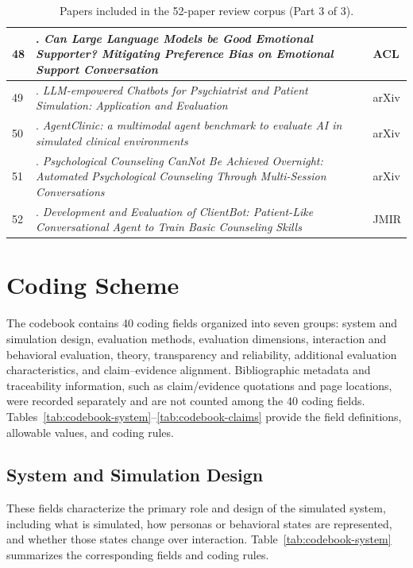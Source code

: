 \begin{table}[p]
\begin{tabular}{p{0.8cm}p{11.1cm}p{3.0cm}}
\midrule
48 &
\citealp{Kang2024Can}. \textit{Can Large Language Models be Good Emotional Supporter? Mitigating Preference Bias on Emotional Support Conversation} &
ACL \\
\midrule
49 &
\citealp{Chen2023LLM-empowered}. \textit{LLM-empowered Chatbots for Psychiatrist and Patient Simulation: Application and Evaluation} &
arXiv \\
\midrule
50 &
\citealp{Schmidgall2025AgentClinic}. \textit{AgentClinic: a multimodal agent benchmark to evaluate AI in simulated clinical environments} &
arXiv \\
\midrule
51 &
\citealp{Wang2025Psychological}. \textit{Psychological Counseling CanNot Be Achieved Overnight: Automated Psychological Counseling Through Multi-Session Conversations} &
arXiv \\
\midrule
52 &
\citealp{Tanana2019Development}. \textit{Development and Evaluation of ClientBot: Patient-Like Conversational Agent to Train Basic Counseling Skills} &
JMIR \\
\bottomrule
\end{tabular}
\caption{Papers included in the 52-paper review corpus (Part 3 of 3).}
\label{tab:reviewed-corpus-3}
\end{table}


\section{Coding Scheme}
\label{app:codebook}

The codebook contains 40 coding fields organized into seven groups:
system and simulation design, evaluation methods, evaluation dimensions,
interaction and behavioral evaluation, theory, transparency and reliability,
additional evaluation characteristics, and claim--evidence alignment. 
Bibliographic metadata and traceability information, such as claim/evidence
quotations and page locations, were recorded separately and are not counted
among the 40 coding fields. 
Tables~\ref{tab:codebook-system}--\ref{tab:codebook-claims} provide the
field definitions, allowable values, and coding rules.

\subsection{System and Simulation Design}

These fields characterize the primary role and design of the simulated system, including what is simulated, how personas or behavioral states are represented, and whether those states change over interaction. 
Table~\ref{tab:codebook-system} summarizes the corresponding fields and coding rules.

